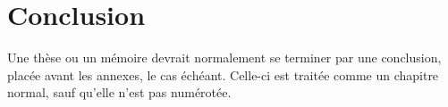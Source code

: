 \chapter*{Conclusion}         %

Une thèse ou un mémoire devrait normalement se terminer par une
conclusion, placée avant les annexes, le cas échéant. Celle-ci est
traitée comme un chapitre normal, sauf qu'elle n'est pas numérotée.
